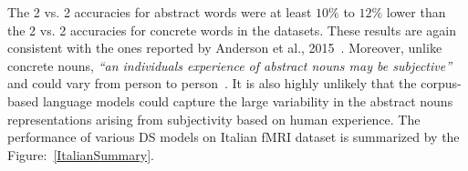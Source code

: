 The 2 vs. 2 accuracies for abstract words were at least $10\%$ to $12\%$ lower than the 2 vs. 2 accuracies for concrete words in the datasets. These results are again consistent with the ones reported by Anderson et al., 2015~\cite{AndersonConcreteness}. Moreover, unlike concrete nouns, \textit{``an individuals experience of abstract nouns may be subjective''} and could vary from person to person~\cite{AndersonConcreteness}. It is also highly unlikely that the corpus-based language models could capture the large variability in the abstract nouns representations arising from subjectivity based on human experience. The performance of various DS models on Italian fMRI dataset is summarized by the Figure:~\ref{ItalianSummary}.


\begin{table}[t]
\centering


\end{table}

